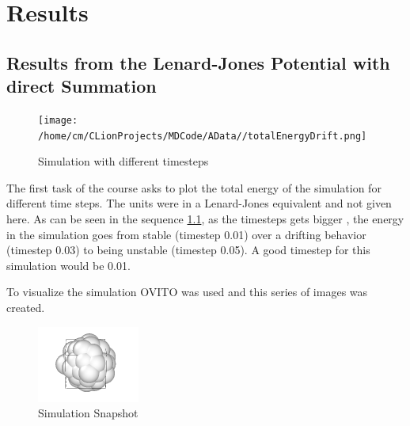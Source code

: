 \chapter{Results}

\section{Results from the Lenard-Jones Potential with direct Summation}

\begin{figure}
	\begin{center}
		\texttt{[image: /home/cm/CLionProjects/MDCode/AData//totalEnergyDrift.png]}
	\end{center}
	\caption[Simulation with different timesteps]{Simulation with different timesteps}
	\label{SimWithTimestep}
\end{figure}
The first task of the course asks to plot the total energy of the simulation for different time steps. The units were in a Lenard-Jones equivalent and not given here. As can be seen in the sequence \ref{SimWithTimestep}, as the timesteps gets bigger , the energy in the simulation goes from stable (timestep 0.01) over a drifting behavior (timestep 0.03) to being unstable (timestep 0.05). A good timestep for this simulation would be 0.01.  
\par
To visualize the simulation OVITO \cite{ovito} was used and this series of images was created.
\begin{figure}
	\begin{center}
		\includegraphics[scale= 0.65]{Figure/1ImageS.png}
	\end{center}
	\caption[Simulation Snapshot]{Simulation Snapshot}
	\label{SimulationSnapshot1}
\end{figure}

